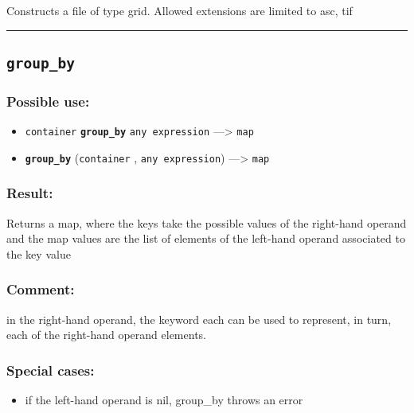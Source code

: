 \documentclass[]{book}
\providecommand{\tightlist}{%
  \setlength{\itemsep}{0pt}\setlength{\parskip}{0pt}}
\theoremstyle{definition}
\theoremstyle{definition}
\theoremstyle{definition}
\theoremstyle{remark}
\begin{document}
Constructs a file of type grid. Allowed extensions are limited to asc,
tif

\begin{center}\rule{0.5\linewidth}{\linethickness}\end{center}

\subsection{\texorpdfstring{\texttt{group\_by}}{group\_by}}\label{group_by}

\subsubsection{Possible use:}\label{possible-use-244}

\begin{itemize}
\tightlist
\item
  \texttt{container} \textbf{\texttt{group\_by}}
  \texttt{any\ expression} ---\textgreater{} \texttt{map}
\item
  \textbf{\texttt{group\_by}} (\texttt{container} ,
  \texttt{any\ expression}) ---\textgreater{} \texttt{map}
\end{itemize}

\subsubsection{Result:}\label{result-235}

Returns a map, where the keys take the possible values of the right-hand
operand and the map values are the list of elements of the left-hand
operand associated to the key value

\subsubsection{Comment:}\label{comment-46}

in the right-hand operand, the keyword each can be used to represent, in
turn, each of the right-hand operand elements.

\subsubsection{Special cases:}\label{special-cases-74}

\begin{itemize}
\tightlist
\item
  if the left-hand operand is nil, group\_by throws an error
\end{itemize}
\end{document}
